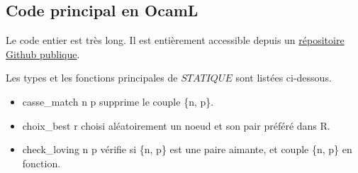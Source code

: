 \documentclass[12pt,a4paper]{article}
\begin{document}
\subsection{Code principal en OcamL}

Le code entier est très long. 
Il est entièrement accessible depuis un \href{https://github.com/Simon8376/TIPE_couplages_stables}{répositoire Github publique}.

Les types et les fonctions principales de $STATIQUE$ sont listées ci-dessous. 
\begin{itemize}
\item casse\_match n p supprime le couple \{n, p\}.
\item choix\_best r choisi aléatoirement un noeud et son pair préféré dans R.
\item check\_loving n p vérifie si \{n, p\} est une paire aimante, et couple \{n, p\} en fonction.
\end{itemize}
\end{document}
